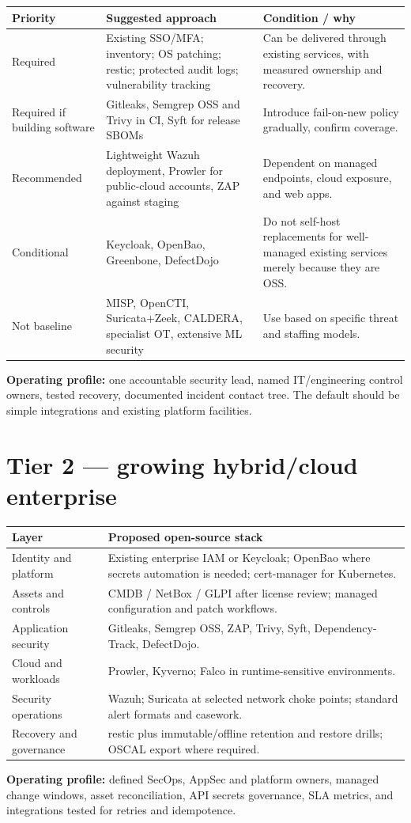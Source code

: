 \documentclass[11pt,oneside]{report}
\begin{document}
\noindent\begin{tabularx}{\textwidth}{P{0.17\textwidth}P{0.36\textwidth}Y}
\toprule Priority & Suggested approach & Condition / why\\\midrule
Required & Existing SSO/MFA; inventory; OS patching; restic; protected audit logs; vulnerability tracking & Can be delivered through existing services, with measured ownership and recovery.\\
Required if building software & Gitleaks, Semgrep OSS and Trivy in CI, Syft for release SBOMs & Introduce fail-on-new policy gradually, confirm coverage.\\
Recommended & Lightweight Wazuh deployment, Prowler for public-cloud accounts, ZAP against staging & Dependent on managed endpoints, cloud exposure, and web apps.\\
Conditional & Keycloak, OpenBao, Greenbone, DefectDojo & Do not self-host replacements for well-managed existing services merely because they are OSS.\\
Not baseline & MISP, OpenCTI, Suricata+Zeek, CALDERA, specialist OT, extensive ML security & Use based on specific threat and staffing models.\\
\bottomrule
\end{tabularx}
\textbf{Operating profile:} one accountable security lead, named IT/engineering control owners, tested recovery, documented incident contact tree. The default should be simple integrations and existing platform facilities.

\section{Tier 2 --- growing hybrid/cloud enterprise}

\noindent\begin{tabularx}{\textwidth}{P{0.23\textwidth}Y}
\toprule Layer & Proposed open-source stack\\\midrule
Identity and platform & Existing enterprise IAM or Keycloak; OpenBao where secrets automation is needed; cert-manager for Kubernetes.\\
Assets and controls & CMDB / NetBox / GLPI after license review; managed configuration and patch workflows.\\
Application security & Gitleaks, Semgrep OSS, ZAP, Trivy, Syft, Dependency-Track, DefectDojo.\\
Cloud and workloads & Prowler, Kyverno; Falco in runtime-sensitive environments.\\
Security operations & Wazuh; Suricata at selected network choke points; standard alert formats and casework.\\
Recovery and governance & restic plus immutable/offline retention and restore drills; OSCAL export where required.\\
\bottomrule
\end{tabularx}
\textbf{Operating profile:} defined SecOps, AppSec and platform owners, managed change windows, asset reconciliation, API secrets governance, SLA metrics, and integrations tested for retries and idempotence.
\end{document}
